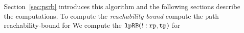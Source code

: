 \begin{enumerate}
    Section~\ref{sec:psrb} introduces this algorithm and the following sections describe the computations. 
    To compute the \emph{reachability-bound}  compute the path reachability-bound for 
    We compute the $\mathtt{lpRB}(l: \mathtt{rp}, \mathtt{tp})$ for 
    \end{enumerate}
